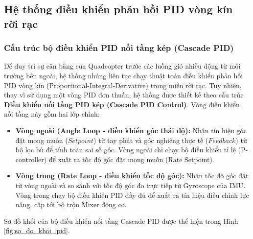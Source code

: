 \subsection{Hệ thống điều khiển phản hồi PID vòng kín rời rạc}

\subsubsection{Cấu trúc bộ điều khiển PID nối tầng kép (Cascade PID)}

Để duy trì sự cân bằng của Quadcopter trước các luồng gió nhiễu động từ môi trường bên ngoài, hệ thống nhúng liên tục chạy thuật toán điều khiển phản hồi PID vòng kín (Proportional-Integral-Derivative) trong miền rời rạc. Tuy nhiên, thay vì sử dụng một vòng PID đơn thuần, hệ thống được thiết kế theo cấu trúc \textbf{Điều khiển nối tầng PID kép (Cascade PID Control)}. Vòng điều khiển nối tầng này gồm hai lớp chính:
\begin{itemize}
    \item \textbf{Vòng ngoài (Angle Loop - điều khiển góc thái độ):} Nhận tín hiệu góc đặt mong muốn ($Setpoint$) từ tay phát và góc nghiêng thực tế ($Feedback$) từ bộ lọc bù để tính toán sai số góc. Vòng ngoài chỉ chạy bộ điều khiển tỉ lệ (P-controller) để xuất ra tốc độ góc đặt mong muốn (Rate Setpoint).
    \item \textbf{Vòng trong (Rate Loop - điều khiển tốc độ góc):} Nhận tốc độ góc đặt từ vòng ngoài và so sánh với tốc độ góc đo trực tiếp từ Gyroscope của IMU. Vòng trong chạy bộ điều khiển PID đầy đủ để xuất ra tín hiệu điều chỉnh lực nâng, cấp tới bộ trộn Mixer động cơ.
\end{itemize}

Sơ đồ khối của bộ điều khiển nối tầng Cascade PID được thể hiện trong Hình \ref{fig:so_do_khoi_pid}.

